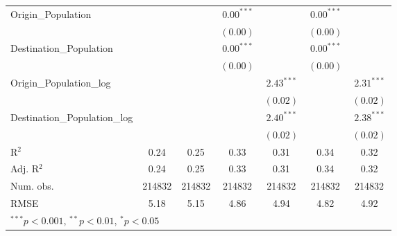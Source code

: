 \begin{table}
\begin{center}
\begin{tabular}{l c c c c c c }
		Origin\_Population           &               &               & $0.00^{***}$  &                & $0.00^{***}$  &                \\
		&               &               & $(0.00)$      &                & $(0.00)$      &                \\
		Destination\_Population      &               &               & $0.00^{***}$  &                & $0.00^{***}$  &                \\
		&               &               & $(0.00)$      &                & $(0.00)$      &                \\
		Origin\_Population\_log      &               &               &               & $2.43^{***}$   &               & $2.31^{***}$   \\
		&               &               &               & $(0.02)$       &               & $(0.02)$       \\
		Destination\_Population\_log &               &               &               & $2.40^{***}$   &               & $2.38^{***}$   \\
		&               &               &               & $(0.02)$       &               & $(0.02)$       \\
		\hline
		R$^2$                        & 0.24          & 0.25          & 0.33          & 0.31           & 0.34          & 0.32           \\
		Adj. R$^2$                   & 0.24          & 0.25          & 0.33          & 0.31           & 0.34          & 0.32           \\
		Num. obs.                    & 214832        & 214832        & 214832        & 214832         & 214832        & 214832         \\
		RMSE                         & 5.18          & 5.15          & 4.86          & 4.94           & 4.82          & 4.92           \\
		\hline			\multicolumn{7}{l}{\scriptsize{$^{***}p<0.001$, $^{**}p<0.01$, $^*p<0.05$}}
		\end{tabular}
		\label{table:Gravity2013Q3}
	\end{center}
\end{table}

